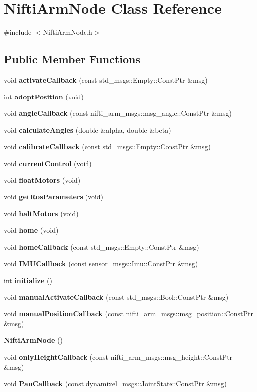 \section{\-Nifti\-Arm\-Node \-Class \-Reference}
\label{classNiftiArmNode}


{\ttfamily \#include $<$\-Nifti\-Arm\-Node.\-h$>$}

\subsection*{\-Public \-Member \-Functions}
\begin{DoxyCompactItemize}
\item 
void {\bf activate\-Callback} (const std\-\_\-msgs\-::\-Empty\-::\-Const\-Ptr \&msg)
\item 
int {\bf adopt\-Position} (void)
\item 
void {\bf angle\-Callback} (const nifti\-\_\-arm\-\_\-msgs\-::msg\-\_\-angle\-::\-Const\-Ptr \&msg)
\item 
void {\bf calculate\-Angles} (double \&alpha, double \&beta)
\item 
void {\bf calibrate\-Callback} (const std\-\_\-msgs\-::\-Empty\-::\-Const\-Ptr \&msg)
\item 
void {\bf current\-Control} (void)
\item 
void {\bf float\-Motors} (void)
\item 
void {\bf get\-Ros\-Parameters} (void)
\item 
void {\bf halt\-Motors} (void)
\item 
void {\bf home} (void)
\item 
void {\bf home\-Callback} (const std\-\_\-msgs\-::\-Empty\-::\-Const\-Ptr \&msg)
\item 
void {\bf \-I\-M\-U\-Callback} (const sensor\-\_\-msgs\-::\-Imu\-::\-Const\-Ptr \&msg)
\item 
int {\bf initialize} ()
\item 
void {\bf manual\-Activate\-Callback} (const std\-\_\-msgs\-::\-Bool\-::\-Const\-Ptr \&msg)
\item 
void {\bf manual\-Position\-Callback} (const nifti\-\_\-arm\-\_\-msgs\-::msg\-\_\-position\-::\-Const\-Ptr \&msg)
\item 
{\bf \-Nifti\-Arm\-Node} ()
\item 
void {\bf only\-Height\-Callback} (const nifti\-\_\-arm\-\_\-msgs\-::msg\-\_\-height\-::\-Const\-Ptr \&msg)
\item 
void {\bf \-Pan\-Callback} (const dynamixel\-\_\-msgs\-::\-Joint\-State\-::\-Const\-Ptr \&msg)

\end{DoxyCompactItemize}
